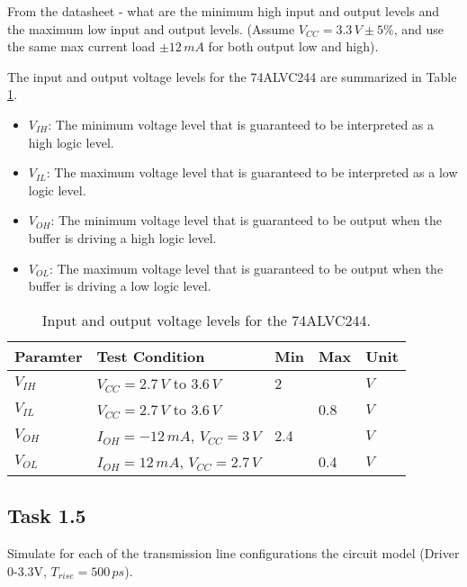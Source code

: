 \documentclass[../main.tex]{subfiles}
\begin{document}
From the datasheet - what are the minimum high input and output levels and the maximum low input and output levels. (Assume $V_{CC} = 3.3\,\si{V} \pm 5\%$, and use the same max current load $\pm 12 \,\si{mA}$ for both output low and high).

\solution

The input and output voltage levels for the 74ALVC244 are summarized in Table \ref{tab:io-levels}.

\begin{itemize}
    \item $V_{IH}$: The minimum voltage level that is guaranteed to be interpreted as a high logic level.
    \item $V_{IL}$: The maximum voltage level that is guaranteed to be interpreted as a low logic level.
    \item $V_{OH}$: The minimum voltage level that is guaranteed to be output when the buffer is driving a high logic level.
    \item $V_{OL}$: The maximum voltage level that is guaranteed to be output when the buffer is driving a low logic level.
\end{itemize}

\begin{table}[h]
    \centering
    \begin{tabular}{l|l|lll}
        \toprule[1pt]
        \textbf{Paramter} & \textbf{Test Condition} & \textbf{Min} & \textbf{Max} & \textbf{Unit} \\
        \midrule
        $V_{IH}$ & $V_{CC} = 2.7\,\si{V}$ to $3.6\,\si{V}$ & 2 &     & $\si{V}$ \\
        $V_{IL}$ & $V_{CC} = 2.7\,\si{V}$ to $3.6\,\si{V}$ &   & 0.8 & $\si{V}$ \\
        $V_{OH}$ & $I_{OH} = -12\,\si{mA}$, $V_{CC} = 3\,\si{V}$& 2.4&&$\si{V}$ \\
        $V_{OL}$ & $I_{OH} = 12\,\si{mA}$, $V_{CC} = 2.7\,\si{V}$&&0.4&$\si{V}$ \\
        \bottomrule[1pt]
    \end{tabular}
    \caption{Input and output voltage levels for the 74ALVC244.}
    \label{tab:io-levels}
\end{table}

\newpage

\subsection{Task 1.5}

Simulate for each of the transmission line configurations the circuit model (Driver 0-3.3V, $T_{rise} = 500\,\si{ps}$).
\end{document}
